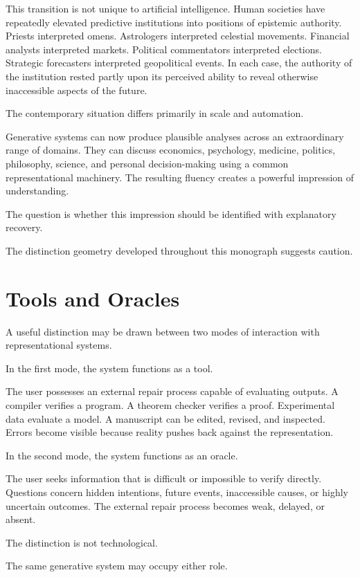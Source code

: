 \documentclass[11pt,oneside,openany]{book}
\begin{document}
This transition is not unique to artificial intelligence. Human societies have repeatedly elevated predictive institutions into positions of epistemic authority. Priests interpreted omens. Astrologers interpreted celestial movements. Financial analysts interpreted markets. Political commentators interpreted elections. Strategic forecasters interpreted geopolitical events. In each case, the authority of the institution rested partly upon its perceived ability to reveal otherwise inaccessible aspects of the future.

The contemporary situation differs primarily in scale and automation.

Generative systems can now produce plausible analyses across an extraordinary range of domains. They can discuss economics, psychology, medicine, politics, philosophy, science, and personal decision-making using a common representational machinery. The resulting fluency creates a powerful impression of understanding.

The question is whether this impression should be identified with explanatory recovery.

The distinction geometry developed throughout this monograph suggests caution.

\section{Tools and Oracles}

A useful distinction may be drawn between two modes of interaction with representational systems.

In the first mode, the system functions as a tool.

The user possesses an external repair process capable of evaluating outputs. A compiler verifies a program. A theorem checker verifies a proof. Experimental data evaluate a model. A manuscript can be edited, revised, and inspected. Errors become visible because reality pushes back against the representation.

In the second mode, the system functions as an oracle.

The user seeks information that is difficult or impossible to verify directly. Questions concern hidden intentions, future events, inaccessible causes, or highly uncertain outcomes. The external repair process becomes weak, delayed, or absent.

The distinction is not technological.

The same generative system may occupy either role.
\end{document}
